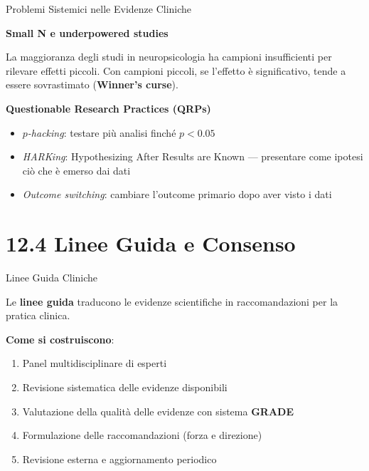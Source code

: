 \documentclass[
  ignorenonframetext,
]{beamer}
\begin{document}
\begin{frame}{Problemi Sistemici nelle Evidenze Cliniche}
\label{problemi-sistemici-nelle-evidenze-cliniche}
\small

\textbf{Small N e underpowered studies}

La maggioranza degli studi in neuropsicologia ha campioni insufficienti
per rilevare effetti piccoli. Con campioni piccoli, se l'effetto è
significativo, tende a essere sovrastimato (\textbf{Winner's curse}).

\vspace{0.4em}

\textbf{Questionable Research Practices (QRPs)}

\begin{itemize}\footnotesize
\item \emph{$p$-hacking}: testare più analisi finché $p < 0.05$
\item \emph{HARKing}: Hypothesizing After Results are Known — presentare come ipotesi ciò che è emerso dai dati
\item \emph{Outcome switching}: cambiare l'outcome primario dopo aver visto i dati
\end{itemize}

\vspace{0.4em}
\end{frame}

\section{12.4 Linee Guida e Consenso}\label{linee-guida-e-consenso}

\begin{frame}{Linee Guida Cliniche}
\label{linee-guida-cliniche}
\small

Le \textbf{linee guida} traducono le evidenze scientifiche in
raccomandazioni per la pratica clinica.

\vspace{0.4em}

\textbf{Come si costruiscono}:

\begin{enumerate}\footnotesize
\item Panel multidisciplinare di esperti
\item Revisione sistematica delle evidenze disponibili
\item Valutazione della qualità delle evidenze con sistema \textbf{GRADE}
\item Formulazione delle raccomandazioni (forza e direzione)
\item Revisione esterna e aggiornamento periodico
\end{enumerate}

\vspace{0.4em}
\end{frame}
\end{document}
